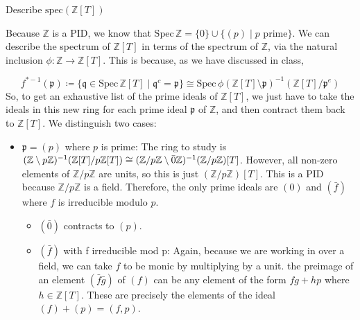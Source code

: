 \begin{problem}\label{itm:integers_polynomial_ring_spectrum}
Describe $\text{spec}(\mathbb{Z}[T])$
\begin{sol}

    Because $\mathbb{Z}$ is a PID, we know that
    $\text{Spec}\,\mathbb{Z} = \{0\} \cup \{(p) \mid p \text{ prime}\}$.
    We can describe the spectrum of $\mathbb{Z}[T]$ in terms of the spectrum of $\mathbb{Z}$,
    via the natural inclusion $\phi:\mathbb{Z} \to \mathbb{Z}[T]$.
    This is because, as we have discussed in class,

    \[
        f^{*-1}(\mathfrak{p})
        \coloneqq
        \{\mathfrak{q} \in \text{Spec} \, \mathbb{Z}[T] \mid \mathfrak{q}^c = \mathfrak{p}\}
        \cong \text{Spec} \, \phi(\mathbb{Z}[T] \setminus \mathfrak{p})^{-1}( \mathbb{Z}[T] / \mathfrak{p}^e)
    \]
    So, to get an exhaustive list of the prime ideals of $\mathbb{Z}[T]$, we just have to take the
    ideals in this new ring for each prime ideal $\mathfrak{p}$ of $\mathbb{Z}$, and then
    contract them back to $\mathbb{Z}[T]$.
    We distinguish two cases:

    \begin{itemize}
        \item $\mathfrak{p} = (p)$ where $p$ is prime:
        The ring to study is $(\mathbb{Z} \setminus p \mathbb{Z})^{-1} (\mathbb{Z}[T]/p\mathbb{Z}[T]) \cong \linebreak
        (\mathbb{Z}/p\mathbb{Z} \setminus \bar{0} \mathbb{Z})^{-1} (\mathbb{Z}/p\mathbb{Z})[T]$.
        However, all non-zero elements of $\mathbb{Z}/p\mathbb{Z}$ are units, so this is just
        $(\mathbb{Z}/p\mathbb{Z})[T]$.
        This is a PID because $\mathbb{Z}/p\mathbb{Z}$ is a field.
        Therefore, the only prime ideals are $(0)$ and $(\bar{f})$ where $f$ is irreducible modulo $p$.

        \begin{itemize}
            \item $(\bar{0})$ contracts to $(p)$.
            \item $(\bar{f})$ with f irreducible mod p: Again, because we are working in over a field,
            we can take  $f$ to be monic by multiplying by a unit.
            the preimage of an element $(\bar{f}\bar{g})$ of $(f)$ can be any element of the
            form $f g + h p$ where $h \in \mathbb{Z}[T]$.
            These are precisely the elements of the ideal
            $(f) + (p) = (f, p)$.

        \end{itemize}


\end{itemize}
\end{sol}
\end{problem}
